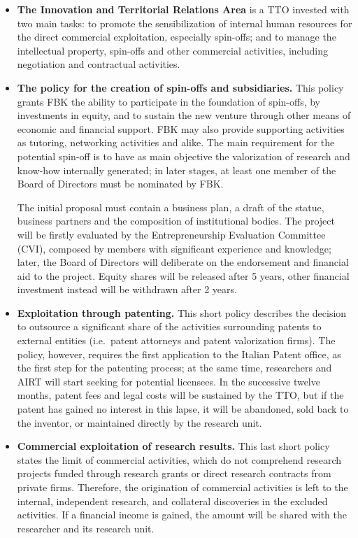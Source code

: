 \begin{itemize}

\item \textbf{The Innovation and Territorial Relations Area} is a TTO invested with two main tasks: to promote the sensibilization of internal human resources for the direct commercial exploitation, especially spin-offs; and to manage the intellectual property, spin-offs and other commercial activities, including negotiation and contractual activities. 

\item \textbf{The policy for the creation of spin-offs and subsidiaries.} This policy grants FBK the ability to participate in the foundation of spin-offs, by investments in equity, and to sustain the new venture through other means of economic and financial support. FBK may also provide supporting activities as tutoring, networking activities and alike. The main requirement for the potential spin-off is to have as main objective the valorization of research and know-how internally generated; in later stages, at least one member of the Board of Directors must be nominated by FBK.

The initial proposal must contain a business plan, a draft of the statue, business partners and the composition of institutional bodies. The project will be firstly evaluated by the Entrepreneurship Evaluation Committee (CVI), composed by members with significant experience and knowledge; later, the Board of Directors will deliberate on the endorsement and financial aid to the project. Equity shares will be released after 5 years, other financial investment instead will be withdrawn after 2 years.

\item \textbf{Exploitation through patenting.} This short policy describes the decision to outsource a significant share of the activities surrounding patents to external entities (i.e.\ patent attorneys and patent valorization firms). The policy, however, requires the first application to the Italian Patent office, as the first step for the patenting process; at the same time, researchers and AIRT will start seeking for potential licensees. In the successive twelve months, patent fees and legal costs will be sustained by the TTO, but if the patent has gained no interest in this lapse, it will be abandoned, sold back to the inventor, or maintained directly by the research unit. 

\item \textbf{Commercial exploitation of research results.} This last short policy states the limit of commercial activities, which do not comprehend research projects funded through research grants or direct research contracts from private firms. Therefore, the origination of commercial activities is left to the internal, independent research, and collateral discoveries in the excluded activities. If a financial income is gained, the amount will be shared with the researcher and its research unit.

\end{itemize}

